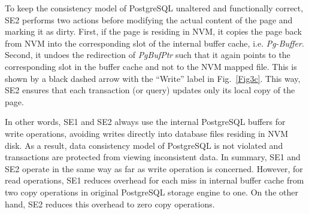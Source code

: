 To keep the consistency model of PostgreSQL unaltered and functionally correct,
SE2 performs two actions before modifying the 
actual content of the page and marking it as dirty. First, if the page is residing in NVM, it copies the page back from NVM into the 
corresponding slot of the internal buffer cache, i.e. \textit{Pg-Buffer}. Second, it undoes the redirection of \textit{PgBufPtr} such that it 
again points to the corresponding slot in the buffer cache and not to the NVM mapped file. This is shown by a black dashed arrow with 
the ``Write'' label in Fig.~\ref{Fig3c}. This way, SE2 ensures that each transaction (or query) updates only its local copy of the page.

In other words, SE1 and SE2 always use the internal PostgreSQL  buffers for write operations, avoiding writes directly into  database files residing in NVM disk. As a result,  data consistency model of PostgreSQL is not violated and transactions are protected from viewing inconsistent data. In summary, SE1 and SE2 operate in the same way as far as write operation is concerned. However, for read operations, SE1 reduces overhead for each miss in internal buffer cache from two copy operations in original PostgreSQL storage engine to one. On the other hand, SE2 reduces this overhead to zero copy operations.